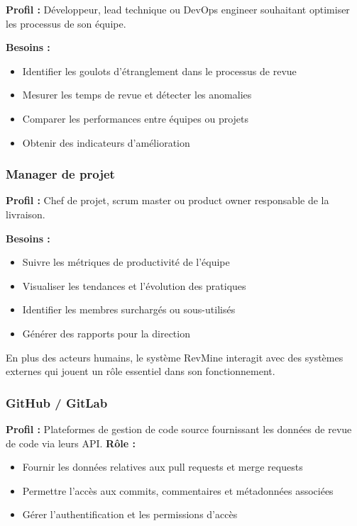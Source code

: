 \textbf{Profil :} Développeur, lead technique ou DevOps engineer souhaitant optimiser les processus de son équipe.

\textbf{Besoins :}
\begin{itemize}
    \item Identifier les goulots d'étranglement dans le processus de revue
    \item Mesurer les temps de revue et détecter les anomalies
    \item Comparer les performances entre équipes ou projets
    \item Obtenir des indicateurs d'amélioration
\end{itemize}

\subsubsection*{Manager de projet}

\textbf{Profil :} Chef de projet, scrum master ou product owner responsable de la livraison.

\textbf{Besoins :}
\begin{itemize}
    \item Suivre les métriques de productivité de l'équipe
    \item Visualiser les tendances et l'évolution des pratiques
    \item Identifier les membres surchargés ou sous-utilisés
    \item Générer des rapports pour la direction
\end{itemize} 
\vspace{1em}
\vspace{1em}
En plus des acteurs humains, le système RevMine interagit avec des systèmes externes qui jouent un rôle essentiel dans son fonctionnement.

\subsubsection*{GitHub / GitLab}
\textbf{Profil :} Plateformes de gestion de code source fournissant les données de revue de code via leurs API.
\textbf{Rôle :}
\begin{itemize}
    \item Fournir les données relatives aux pull requests et merge requests
    \item Permettre l’accès aux commits, commentaires et métadonnées associées
    \item Gérer l’authentification et les permissions d’accès
\end{itemize}

